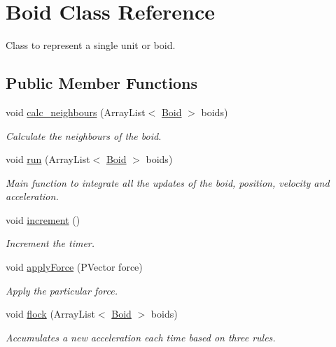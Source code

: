 \hypertarget{class_boid}{}\section{Boid Class Reference}
\label{class_boid}


Class to represent a single unit or boid.  


\subsection*{Public Member Functions}
\begin{DoxyCompactItemize}
\item 
void \mbox{\hyperlink{class_boid_a3512b360e60eec95f22e1bbaf14d3346}{calc\+\_\+neighbours}} (Array\+List$<$ \mbox{\hyperlink{class_boid}{Boid}} $>$ boids)
\begin{DoxyCompactList}\small\item\em Calculate the neighbours of the boid. \end{DoxyCompactList}\item 
void \mbox{\hyperlink{class_boid_ae286f6aa9f01bed28bc379200c3d7885}{run}} (Array\+List$<$ \mbox{\hyperlink{class_boid}{Boid}} $>$ boids)
\begin{DoxyCompactList}\small\item\em Main function to integrate all the updates of the boid, position, velocity and acceleration. \end{DoxyCompactList}\item 
\mbox{\label{class_boid_a86313f583d25e2942a38321a708a2cd7}} 
void \mbox{\hyperlink{class_boid_a86313f583d25e2942a38321a708a2cd7}{increment}} ()
\begin{DoxyCompactList}\small\item\em Increment the timer. \end{DoxyCompactList}\item 
void \mbox{\hyperlink{class_boid_a4e57f0bfa16c25001a7b0909185781e4}{apply\+Force}} (P\+Vector force)
\begin{DoxyCompactList}\small\item\em Apply the particular force. \end{DoxyCompactList}\item 
void \mbox{\hyperlink{class_boid_a7a31874a995e7439e894dc0141979ab2}{flock}} (Array\+List$<$ \mbox{\hyperlink{class_boid}{Boid}} $>$ boids)
\begin{DoxyCompactList}\small\item\em Accumulates a new acceleration each time based on three rules. \end{DoxyCompactList}\item 

\end{DoxyCompactItemize}
